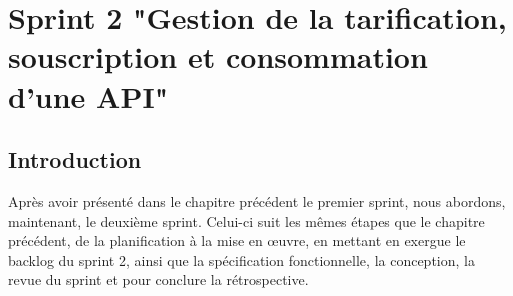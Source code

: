 \chapter{Sprint 2 "Gestion de la tarification, souscription et consommation d'une API"}
	
\section*{Introduction}
Après avoir présenté dans le chapitre précédent le premier sprint, nous abordons, maintenant, le deuxième sprint. Celui-ci suit les mêmes étapes que le chapitre précédent, de la planification à la mise en œuvre, en mettant en exergue le backlog du sprint 2, ainsi que la spécification fonctionnelle, la conception, la revue du sprint et  pour conclure la rétrospective.


